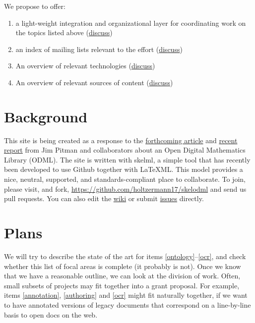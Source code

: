 \documentclass{article}
\begin{document}
We propose to offer:

\begin{enumerate}
\item\label{integration} a light-weight integration and organizational layer for coordinating work on the topics listed above (\href{https://github.com/holtzermann17/skelodml/wiki/1.-Home}{discuss})
\item\label{mail} an index of mailing lists relevant to the effort (\href{https://github.com/holtzermann17/skelodml/wiki/2.-Mailing-lists}{discuss})
\item\label{technology} An overview of relevant technologies (\href{https://github.com/holtzermann17/skelodml/wiki/3.-Technology-overview}{discuss})
\item\label{content} An overview of relevant sources of content (\href{https://github.com/holtzermann17/skelodml/wiki/4.-Content-overview}{discuss})
\end{enumerate}

\section{Background}

This site is being created as a response to the  \href{http://www.mathunion.org/fileadmin/CEIC/planning_wdml.pdf}{forthcoming article} and
 \href{http://arxiv.org/abs/1404.1905}{recent report} from Jim Pitman and collaborators about an Open Digital Mathematics Library (ODML).
%
The site is written with skelml, a simple tool that has recently been developed to use Github together with \LaTeX ML.  This model provides a nice, neutral, supported, and standards-compliant place to collaborate.  To join, please visit, and fork, \url{https://github.com/holtzermann17/skelodml} and send us pull requests.  You can also edit the \href{https://github.com/holtzermann17/skelodml/wiki}{wiki} or
submit \href{https://github.com/holtzermann17/skelodml/issues}{issues} directly.

\section{Plans}

We will try to describe the state of the art for items \ref{ontology}--\ref{ocr}, and check whether this list of focal areas is complete (it probably is not).  Once we know that we have a reasonable outline, we can look at the division of work.  Often, small subsets of projects may fit together into a grant proposal.  For example, items \ref{annotation}, \ref{authoring} and \ref{ocr} might fit naturally together, if we want to have annotated versions of legacy documents that correspond on a line-by-line basis to open docs on the web.
\end{document}
